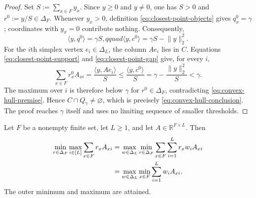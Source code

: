 \begin{proof}
Set $S:=\sum_{x\in F}y_x$.  Since $y\ge0$ and $y\ne0$, one has
$S>0$ and $r^0:=y/S\in\Delta_F$.  Whenever $y_x>0$, definition
\eqref{eq:closest-point-objects} gives $q_x^0=\gamma$; coordinates with
$y_x=0$ contribute nothing.  Consequently,
\begin{equation}\label{eq:closest-point-gap}
\langle y,q^0\rangle=\gamma S,qquad
\langle y,c^0\rangle=\gamma S-\lVert y\rVert_2^2.
\end{equation}
For the $i$th simplex vertex $e_i\in\Delta_L$, the column $Ae_i$ lies in
$C$.  Equations \eqref{eq:closest-point-support} and
\eqref{eq:closest-point-gap} give, for every $i$,
\[
\sum_{x\in F}r_x^0A_{xi}
=\frac{\langle y,Ae_i\rangle}{S}
\le\frac{\langle y,c^0\rangle}{S}
=\gamma-\frac{\lVert y\rVert_2^2}{S}
<\gamma.
\]
The maximum over $i$ is therefore below $\gamma$ for
$r^0\in\Delta_F$, contradicting \eqref{eq:convex-hull-premise}.  Hence
$C\cap Q_\gamma\ne\varnothing$, which is precisely
\eqref{eq:convex-hull-conclusion}.  The proof reaches $\gamma$ itself and
uses no limiting sequence of smaller thresholds.
\end{proof}

\begin{proposition}
\label{prop:step-003-finite-minimax}
Let $F$ be a nonempty finite set, let $L\ge1$, and let
$A\in\mathbb R^{F\times L}$.  Then
\begin{align}
\min_{r\in\Delta_F}\max_{i\in[L]}
\sum_{x\in F}r_xA_{xi}
&=\max_{w\in\Delta_L}\min_{r\in\Delta_F}
\sum_{x\in F}\sum_{i=1}^Lr_xw_iA_{xi}\notag\\
&=\max_{w\in\Delta_L}\min_{x\in F}
\sum_{i=1}^Lw_iA_{xi}.
\label{eq:finite-minimax}
\end{align}
The outer minimum and maximum are attained.
\end{proposition}

